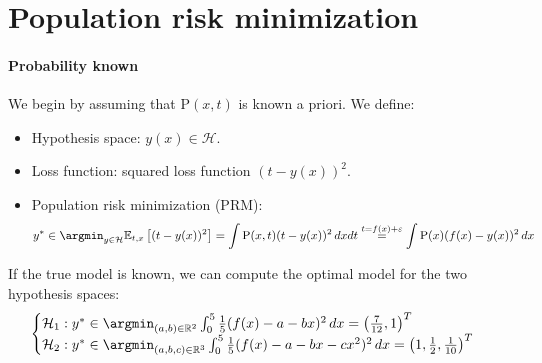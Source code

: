 \section{Population risk minimization}

\paragraph*{Probability known}
We begin by assuming that $\text{P}(x,t)$ is known a priori. 
We define:
\begin{itemize}
    \item Hypothesis space: $y(x) \in\mathcal{H}$. 
    \item Loss function: squared loss function $(t-y(x))^2$. 
    \item Population risk minimization (PRM):
        \[y^\ast\in\argmin_{y \in \mathcal{H}}\mathbb{E}_{t,x}\left[(t-y(x))^2\right]=\int\text{P}(x,t)(t-y(x))^2\,dxdt\overset{t=f(x)+\varepsilon}{=}\int\text{P}(x)(f(x)-y(x))^2\,dx\]
\end{itemize}

If the true model is known, we can compute the optimal model for the two hypothesis spaces:
\[\begin{cases}
    \mathcal{H}_1:y^\ast\in\argmin_{(a,b)\in\mathbb{R}^2}\int_0^5\frac{1}{5}(f(x)-a-bx)^2\,dx=\left(\frac{7}{12},1\right)^T \\
    \mathcal{H}_2:y^\ast\in\argmin_{(a,b,c)\in\mathbb{R}^3}\int_0^5\frac{1}{5}(f(x)-a-bx-cx^2)^2\,dx=\left(1,\frac{1}{2},\frac{1}{10}\right)^T
\end{cases}\]

